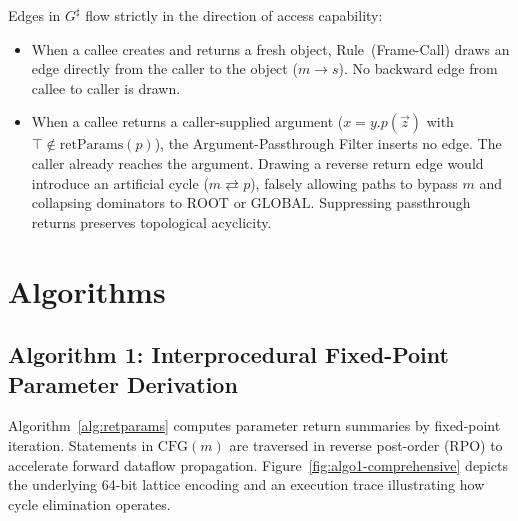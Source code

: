 \documentclass[12pt,a4paper]{article}
\newcommand{\GLOBAL}{\text{GLOBAL}}
\newcommand{\ROOT}{\text{ROOT}}
\newcommand{\retParams}{\text{retParams}}
\begin{document}
Edges in $G^\sharp$ flow strictly in the direction of access capability:

\begin{itemize}
  \item When a callee creates and returns a fresh object, Rule~(Frame-Call) draws an edge directly from the caller to the object ($m \to s$). No backward edge from callee to caller is drawn.
  \item When a callee returns a caller-supplied argument ($x = y.p(\vec{z})$ with $\top \notin \retParams(p)$), the Argument-Passthrough Filter inserts no edge. The caller already reaches the argument. Drawing a reverse return edge would introduce an artificial cycle ($m \rightleftarrows p$), falsely allowing paths to bypass $m$ and collapsing dominators to $\ROOT$ or $\GLOBAL$. Suppressing passthrough returns preserves topological acyclicity.
\end{itemize}

\section{Algorithms}
\label{sec:algorithms}

\subsection{Algorithm 1: Interprocedural Fixed-Point Parameter Derivation}

Algorithm~\ref{alg:retparams} computes parameter return summaries by fixed-point iteration. Statements in $\text{CFG}(m)$ are traversed in reverse post-order (RPO) to accelerate forward dataflow propagation. Figure~\ref{fig:algo1-comprehensive} depicts the underlying 64-bit lattice encoding and an execution trace illustrating how cycle elimination operates.
\end{document}
